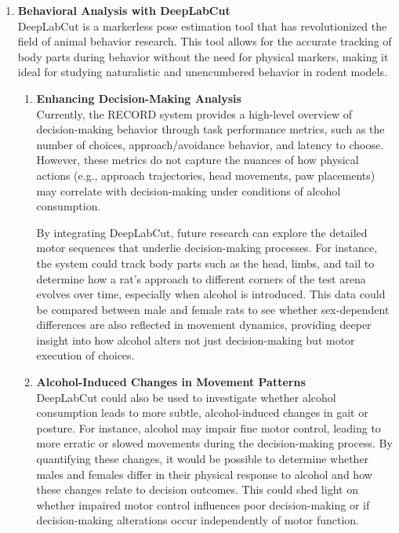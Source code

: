 \documentclass{article}
\begin{document}
\begin{enumerate}
    \item \textbf{Behavioral Analysis with DeepLabCut}\\
    DeepLabCut is a markerless pose estimation tool that has revolutionized the field of animal behavior research. This tool allows for the accurate tracking of body parts during behavior without the need for physical markers, making it ideal for studying naturalistic and unencumbered behavior in rodent models.
    
    \begin{enumerate}
    \item \textbf{Enhancing Decision-Making Analysis}\\
    Currently, the RECORD system provides a high-level overview of decision-making behavior through task performance metrics, such as the number of choices, approach/avoidance behavior, and latency to choose. However, these metrics do not capture the nuances of how physical actions (e.g., approach trajectories, head movements, paw placements) may correlate with decision-making under conditions of alcohol consumption.

    \vspace{1em}

    By integrating DeepLabCut, future research can explore the detailed motor sequences that underlie decision-making processes. For instance, the system could track body parts such as the head, limbs, and tail to determine how a rat’s approach to different corners of the test arena evolves over time, especially when alcohol is introduced. This data could be compared between male and female rats to see whether sex-dependent differences are also reflected in movement dynamics, providing deeper insight into how alcohol alters not just decision-making but motor execution of choices.
    
    \item \textbf{Alcohol-Induced Changes in Movement Patterns}\\
    DeepLabCut could also be used to investigate whether alcohol consumption leads to more subtle, alcohol-induced changes in gait or posture. For instance, alcohol may impair fine motor control, leading to more erratic or slowed movements during the decision-making process. By quantifying these changes, it would be possible to determine whether males and females differ in their physical response to alcohol and how these changes relate to decision outcomes. This could shed light on whether impaired motor control influences poor decision-making or if decision-making alterations occur independently of motor function.
    \end{enumerate}


\end{enumerate}
\end{document}
